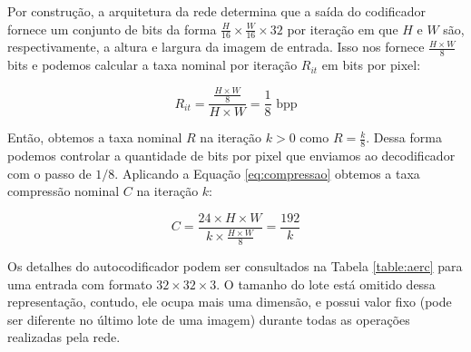 Por construção, a arquitetura da rede determina que a saída do codificador fornece um conjunto de bits da forma $\frac{H}{16} \times \frac{W}{16} \times 32$ por iteração em que $H$ e $W$ são, respectivamente, a altura e largura da imagem de entrada. Isso nos fornece $\frac{H \times W}{8}$ bits e podemos calcular a taxa nominal por iteração $R_{it}$ em bits por pixel:

\begin{equation}
\label{eq:bpp}
R_{it} = \frac{\frac{H \times W}{8}}{H \times W} =  \frac{1}{8}\text{ bpp} 
\end{equation}

Então, obtemos a taxa nominal $R$ na iteração $k>0$ como $R =\frac{k}{8} $.  Dessa forma podemos controlar a quantidade de bits por pixel que enviamos ao decodificador com o passo de $1/8$. Aplicando a Equação \ref{eq:compressao} obtemos a taxa compressão nominal $C$ na iteração $k$: 

\begin{equation}
\label{eq:tc}
C = \frac{24 \times H \times W}{k \times \frac{H \times W}{8}} =  \frac{192}{k} 
\end{equation}


Os detalhes do autocodificador podem ser consultados na Tabela \ref{table:aerc} para uma entrada com formato $32 \times 32 \times 3$. O tamanho do lote está omitido dessa representação, contudo,  ele ocupa mais uma dimensão, e possui valor fixo (pode ser diferente no último lote de uma imagem) durante todas as operações realizadas pela rede.

